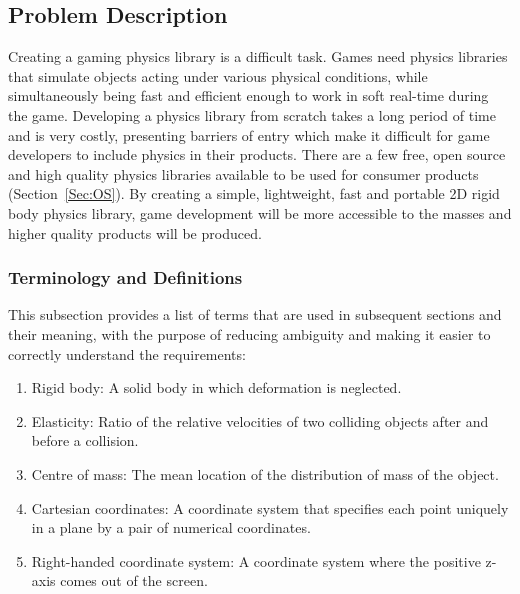 \documentclass[12pt]{article}
\begin{document}
\subsection{Problem Description}
\label{Sec:PD}
Creating a gaming physics library is a difficult task. Games need physics libraries that simulate objects acting under various physical conditions, while simultaneously being fast and efficient enough to work in soft real-time during the game. Developing a physics library from scratch takes a long period of time and is very costly, presenting barriers of entry which make it difficult for game developers to include physics in their products. There are a few free, open source and high quality physics libraries available to be used for consumer products (Section~\ref{Sec:OS}). By creating a simple, lightweight, fast and portable 2D rigid body physics library, game development will be more accessible to the masses and higher quality products will be produced.
\subsubsection{Terminology and Definitions}
\label{Sec:TaD}
This subsection provides a list of terms that are used in subsequent sections and their meaning, with the purpose of reducing ambiguity and making it easier to correctly understand the requirements:
\begin{enumerate}
\item{Rigid body: A solid body in which deformation is neglected.}
\item{Elasticity: Ratio of the relative velocities of two colliding objects after and before a collision.}
\item{Centre of mass: The mean location of the distribution of mass of the object.}
\item{Cartesian coordinates: A coordinate system that specifies each point uniquely in a plane by a pair of numerical coordinates.}
\item{Right-handed coordinate system: A coordinate system where the positive z-axis comes out of the screen.}
\end{enumerate}
\end{document}
